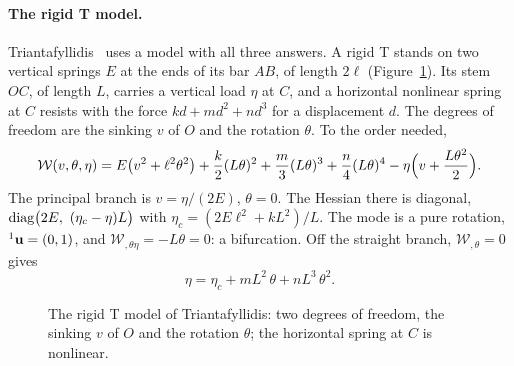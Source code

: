 \paragraph{The rigid T model.}
%
Triantafyllidis~\cite{ld-triantafyllidis2011} uses a model with all three answers.
A rigid T stands on two vertical springs $E$ at the ends of its bar $AB$, of length
$2\ell$ (Figure~\ref{fig:ld-tmodel-sketch}). Its stem $OC$, of length $L$, carries a
vertical load $\eta$ at $C$, and a horizontal nonlinear spring at $C$ resists with
the force $k d + m d^2 + n d^3$ for a displacement $d$. The degrees of freedom are
the sinking $v$ of $O$ and the rotation $\theta$. To the order needed,
\begin{equation}\label{eq:ld-tmodel}
  \mathcal{W}(v,\theta,\eta) = E\bigl(v^2 + \ell^2\theta^2\bigr) + \frac k2 (L\theta)^2
  + \frac m3 (L\theta)^3 + \frac n4 (L\theta)^4 - \eta\Bigl(v + \frac{L\theta^2}2\Bigr).
\end{equation}
The principal branch is $v = \eta/(2E)$, $\theta = 0$. The Hessian there is diagonal,
$\operatorname{diag}\bigl(2E,\ (\eta_c - \eta)L\bigr)$ with $\eta_c = (2E\ell^2 + kL^2)/L$. The mode is a
pure rotation, ${}^1\mathbf{u} = (0,1)$, and $\mathcal{W}_{,\theta\eta} = -L\theta = 0$: a
bifurcation. Off the straight branch, $\mathcal{W}_{,\theta} = 0$ gives
\begin{equation}\label{eq:ld-tmodel-path}
  \eta = \eta_c + m L^2\,\theta + n L^3\,\theta^2 .
\end{equation}

\begin{figure}[ht]
  \centering
  \caption{The rigid T model of Triantafyllidis: two degrees of freedom, the sinking
    $v$ of $O$ and the rotation $\theta$; the horizontal spring at $C$ is nonlinear.}
  \label{fig:ld-tmodel-sketch}
\end{figure}


